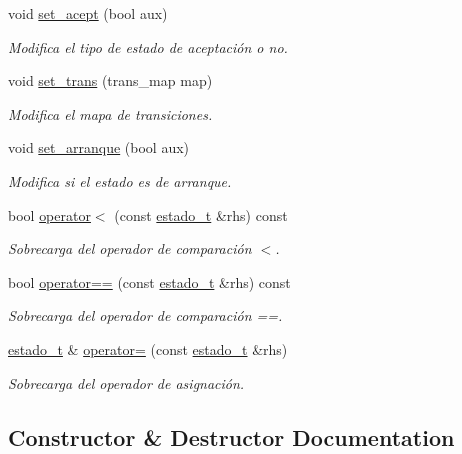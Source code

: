 \begin{DoxyCompactItemize}
void \hyperlink{classestado__t_afc99cf41f63ca6c25bf38ef96e330ec5}{set\+\_\+acept} (bool aux)
\begin{DoxyCompactList}\small\item\em Modifica el tipo de estado de aceptación o no. \end{DoxyCompactList}\item 
void \hyperlink{classestado__t_a387cecb303d45faa2c7b3a4a5806bc5b}{set\+\_\+trans} (trans\+\_\+map map)
\begin{DoxyCompactList}\small\item\em Modifica el mapa de transiciones. \end{DoxyCompactList}\item 
void \hyperlink{classestado__t_a2121978a91821e553cedd8f7f0c1c71c}{set\+\_\+arranque} (bool aux)
\begin{DoxyCompactList}\small\item\em Modifica si el estado es de arranque. \end{DoxyCompactList}\item 
bool \hyperlink{classestado__t_a2af7f5f4c4c72009924f4f29aadb533b}{operator$<$} (const \hyperlink{classestado__t}{estado\+\_\+t} \&rhs) const
\begin{DoxyCompactList}\small\item\em Sobrecarga del operador de comparación $<$. \end{DoxyCompactList}\item 
bool \hyperlink{classestado__t_aa79cde64582824c8e4b313dae522b4d3}{operator==} (const \hyperlink{classestado__t}{estado\+\_\+t} \&rhs) const
\begin{DoxyCompactList}\small\item\em Sobrecarga del operador de comparación ==. \end{DoxyCompactList}\item 
\hyperlink{classestado__t}{estado\+\_\+t} \& \hyperlink{classestado__t_ad7a36a03430853701e4591e05187a14e}{operator=} (const \hyperlink{classestado__t}{estado\+\_\+t} \&rhs)
\begin{DoxyCompactList}\small\item\em Sobrecarga del operador de asignación. \end{DoxyCompactList}\end{DoxyCompactItemize}


\subsection{Constructor \& Destructor Documentation}
\mbox{\label{classestado__t_a3f5cdd06d18afb8c21c18134a2ef7d84}} 
